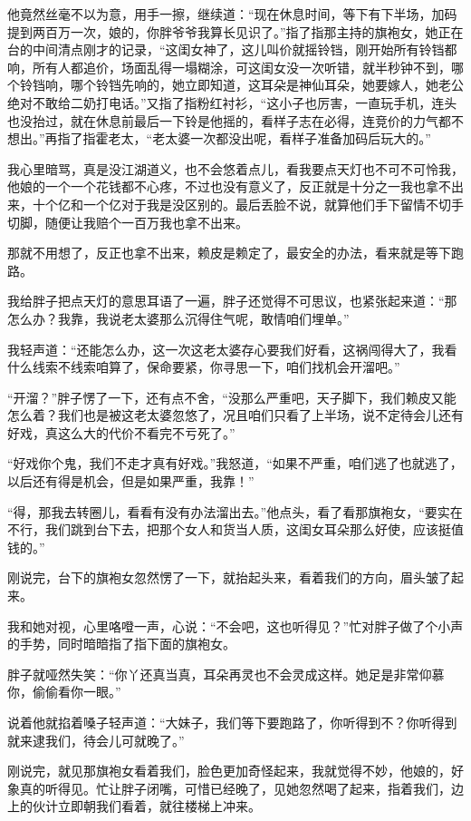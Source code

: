 他竟然丝毫不以为意，用手一擦，继续道：“现在休息时间，等下有下半场，加码提到两百万一次，娘的，你胖爷爷我算长见识了。”指了指那主持的旗袍女，她正在台的中间清点刚才的记录，“这闺女神了，这儿叫价就摇铃铛，刚开始所有铃铛都响，所有人都追价，场面乱得一塌糊涂，可这闺女没一次听错，就半秒钟不到，哪个铃铛响，哪个铃铛先响的，她立即知道，这耳朵是神仙耳朵，她要嫁人，她老公绝对不敢给二奶打电话。”又指了指粉红衬衫，“这小子也厉害，一直玩手机，连头也没抬过，就在休息前最后一下铃是他摇的，看样子志在必得，连竞价的力气都不想出。”再指了指霍老太，“老太婆一次都没出呢，看样子准备加码后玩大的。”

我心里暗骂，真是没江湖道义，也不会悠着点儿，看我要点天灯也不可不可怜我，他娘的一个一个花钱都不心疼，不过也没有意义了，反正就是十分之一我也拿不出来，十个亿和一个亿对于我是没区别的。最后丢脸不说，就算他们手下留情不切手切脚，随便让我赔个一百万我也拿不出来。

那就不用想了，反正也拿不出来，赖皮是赖定了，最安全的办法，看来就是等下跑路。

我给胖子把点天灯的意思耳语了一遍，胖子还觉得不可思议，也紧张起来道：“那怎么办？我靠，我说老太婆那么沉得住气呢，敢情咱们埋单。”

我轻声道：“还能怎么办，这一次这老太婆存心要我们好看，这祸闯得大了，我看什么线索不线索咱算了，保命要紧，你寻思一下，咱们找机会开溜吧。”

“开溜？”胖子愣了一下，还有点不舍，“没那么严重吧，天子脚下，我们赖皮又能怎么着？我们也是被这老太婆忽悠了，况且咱们只看了上半场，说不定待会儿还有好戏，真这么大的代价不看完不亏死了。”

“好戏你个鬼，我们不走才真有好戏。”我怒道，“如果不严重，咱们逃了也就逃了，以后还有得是机会，但是如果严重，我靠！”

“得，那我去转圈儿，看看有没有办法溜出去。”他点头，看了看那旗袍女，“要实在不行，我们跳到台下去，把那个女人和货当人质，这闺女耳朵那么好使，应该挺值钱的。”

刚说完，台下的旗袍女忽然愣了一下，就抬起头来，看着我们的方向，眉头皱了起来。

我和她对视，心里咯噔一声，心说：“不会吧，这也听得见？”忙对胖子做了个小声的手势，同时暗暗指了指下面的旗袍女。

胖子就哑然失笑：“你丫还真当真，耳朵再灵也不会灵成这样。她足是非常仰慕你，偷偷看你一眼。”

说着他就掐着嗓子轻声道：“大妹子，我们等下要跑路了，你听得到不？你听得到就来逮我们，待会儿可就晚了。”

刚说完，就见那旗袍女看着我们，脸色更加奇怪起来，我就觉得不妙，他娘的，好象真的听得见。忙让胖子闭嘴，可惜已经晚了，见她忽然喝了起来，指着我们，边上的伙计立即朝我们看着，就往楼梯上冲来。

